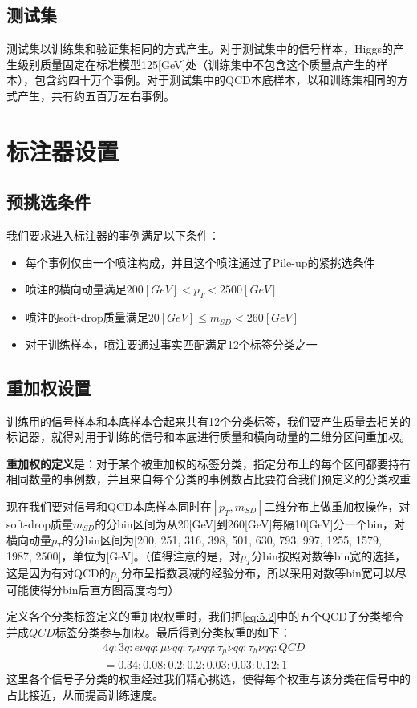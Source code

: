 \subsection{测试集}
测试集以训练集和验证集相同的方式产生。对于测试集中的信号样本，Higgs的产生级别质量固定在标准模型125[GeV]处（训练集中不包含这个质量点产生的样本），包含约四十万个事例。对于测试集中的QCD本底样本，以和训练集相同的方式产生，共有约五百万左右事例。


\section{标注器设置}
\subsection{预挑选条件}
我们要求进入标注器的事例满足以下条件：
\begin{itemize}
    \item 每个事例仅由一个喷注构成，并且这个喷注通过了Pile-up的紧挑选条件
    \item 喷注的横向动量满足$200[\si{GeV}]<p_T<2500[\si{GeV}]$
    \item 喷注的soft-drop质量满足$20[\si{GeV}]\leq m_{SD}<260[\si{GeV}]$
    \item 对于训练样本，喷注要通过事实匹配满足12个标签分类之一
\end{itemize}
\subsection{重加权设置}
训练用的信号样本和本底样本合起来共有12个分类标签，我们要产生质量去相关的标记器，就得对用于训练的信号和本底进行质量和横向动量的二维分区间重加权。

\textbf{重加权的定义}是：对于某个被重加权的标签分类，指定分布上的每个区间都要持有相同数量的事例数，并且来自每个分类的事例数占比要符合我们预定义的分类权重

现在我们要对信号和QCD本底样本同时在$[p_T,m_{SD}]$二维分布上做重加权操作，对soft-drop质量$m_{SD}$的分bin区间为从20[GeV]到260[GeV]每隔10[GeV]分一个bin，对横向动量$p_T$的分bin区间为[200, 251, 316, 398, 501, 630, 793, 997, 1255, 1579, 1987, 2500]，单位为[GeV]。（值得注意的是，对$p_T$分bin按照对数等bin宽的选择，这是因为有对QCD的$p_T$分布呈指数衰减的经验分布，所以采用对数等bin宽可以尽可能使得分bin后直方图高度均匀）

定义各个分类标签定义的重加权权重时，我们把\eqref{eq:5.2}中的五个QCD子分类都合并成$QCD$标签分类参与加权。最后得到分类权重的如下：
\begin{equation}
\begin{split}
    4q:3q:e\nu qq:\mu\nu qq:\tau_e\nu qq:\tau_\mu\nu qq:\tau_h\nu qq:QCD \\
    =0.34:0.08:0.2:0.2:0.03:0.03:0.12:1 &
\end{split}
\end{equation}
这里各个信号子分类的权重经过我们精心挑选，使得每个权重与该分类在信号中的占比接近，从而提高训练速度。

